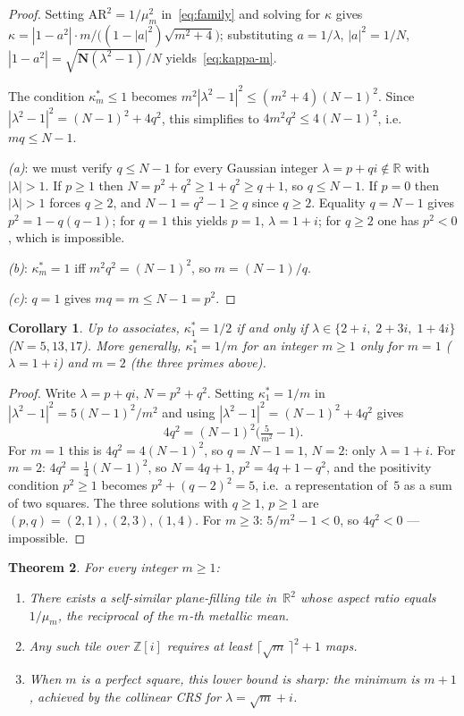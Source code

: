 \documentclass{amsart}
\newtheorem{theorem}{Theorem}
\newtheorem{corollary}[theorem]{Corollary}
\theoremstyle{definition}
\theoremstyle{remark}
\begin{document}
\begin{proof}
Setting $\mathrm{AR}^2 = 1/\mu_m^2$ in~\eqref{eq:family}
and solving for $\kappa$ gives
$\kappa = |1-a^2|\cdot m/\bigl((1-|a|^2)\sqrt{m^2+4}\bigr)$;
substituting $a=1/\lambda$, $|a|^2=1/N$,
$|1-a^2|=\sqrt{\mathbf{N}(\lambda^2-1)}/N$
yields~\eqref{eq:kappa-m}.

The condition $\kappa_m^*\leq 1$ becomes
$m^2|\lambda^2-1|^2 \leq (m^2+4)(N\!-\!1)^2$.
Since $|\lambda^2-1|^2 = (N\!-\!1)^2+4q^2$, this simplifies to
$4m^2q^2 \leq 4(N\!-\!1)^2$, i.e.\ $mq\leq N\!-\!1$.

\textit{(a)}: we must verify $q\leq N-1$ for every Gaussian integer
$\lambda=p+qi\notin\mathbb{R}$ with $|\lambda|>1$.
If $p\geq 1$ then $N=p^2+q^2\geq 1+q^2\geq q+1$, so $q\leq N-1$.
If $p=0$ then $|\lambda|>1$ forces $q\geq 2$, and
$N-1=q^2-1\geq q$ since $q\geq 2$.
Equality $q=N\!-\!1$ gives $p^2=1-q(q\!-\!1)$;
for $q=1$ this yields $p=1$, $\lambda=1+i$;
for $q\geq 2$ one has $p^2<0$, which is impossible.

\textit{(b)}: $\kappa_m^*=1$ iff $m^2q^2=(N\!-\!1)^2$,
so $m=(N\!-\!1)/q$.

\textit{(c)}: $q=1$ gives $mq = m \leq N-1 = p^2$.
\end{proof}

\begin{corollary}\label{cor:half}
Up to associates, $\kappa_1^*=1/2$ if and only if
$\lambda\in\{2+i,\;2+3i,\;1+4i\}$ \textup{(}$N=5,13,17$\textup{)}.
More generally, $\kappa_1^* = 1/m$ for an integer $m\geq 1$ only for
$m=1$ \textup{(}$\lambda=1+i$\textup{)} and $m=2$
\textup{(}the three primes above\textup{)}.
\end{corollary}

\begin{proof}
Write $\lambda=p+qi$, $N=p^2+q^2$.  Setting $\kappa_1^*=1/m$ in
$|\lambda^2-1|^2 = 5(N-1)^2/m^2$ and using
$|\lambda^2-1|^2 = (N-1)^2+4q^2$ gives
\[
  4q^2 = (N\!-\!1)^2\!\bigl(\tfrac{5}{m^2}-1\bigr).
\]
For $m=1$ this is $4q^2=4(N\!-\!1)^2$, so $q=N\!-\!1=1$, $N=2$:
only $\lambda=1+i$.
For $m=2$: $4q^2 = \frac14(N\!-\!1)^2$, so $N=4q+1$, $p^2=4q+1-q^2$,
and the positivity condition $p^2\geq 1$ becomes
$p^2+(q-2)^2 = 5$, i.e.\ a representation of~$5$ as a sum of two
squares.  The three solutions with $q\geq 1$, $p\geq 1$ are
$(p,q)=(2,1),(2,3),(1,4)$.
For $m\geq 3$: $5/m^2-1 < 0$, so $4q^2<0$ --- impossible.
\end{proof}

\begin{theorem}\label{thm:metallic}
For every integer $m\geq 1$:
\begin{enumerate}[\upshape(a)]
\item There exists a self-similar plane-filling tile
  in~$\mathbb{R}^2$ whose aspect ratio equals
  $1/\mu_m$, the reciprocal of the $m$-th metallic mean.
\item Any such tile over $\mathbb{Z}[i]$ requires at least
  $\lceil\sqrt{m}\,\rceil^2 + 1$ maps.
\item When $m$ is a perfect square, this lower bound is sharp:
  the minimum is $m+1$, achieved by the collinear CRS for
  $\lambda = \sqrt{m}+i$.
\end{enumerate}
\end{theorem}
\end{document}

